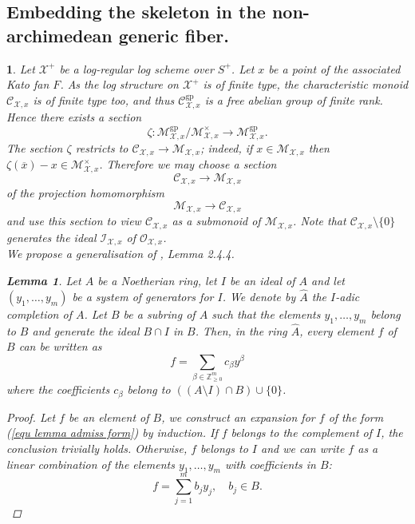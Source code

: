 \documentclass{amsart}%
\numberwithin{equation}{subsection}
\theoremstyle{plain2}
\newtheorem{lemma}[equation]{Lemma}
\theoremstyle{definition2}
\theoremstyle{stepstyle}
\theoremstyle{point}
\theoremstyle{subpoint}
\newtheorem{subpoint}[equation]{}%
\newcommand{\spa}[1]{\begin{subpoint}#1\end{subpoint}}           %
\newcommand{\Z}{\ensuremath{\mathbb{Z}}}
\newcommand{\cX}{\ensuremath{\mathscr{X}}}
\newcommand{\caM}{\ensuremath{\mathcal{M}}}
\newcommand{\caC}{\ensuremath{\mathcal{C}}}
\newcommand{\caI}{\ensuremath{\mathcal{I}}}
\newcommand{\gp}{\mathrm{gp}}
\begin{document}
\subsection{Embedding the skeleton in the non-archimedean generic fiber.}
\spa{Let $\cX^+$ be a log-regular log scheme over $S^+$. Let $x$ be a point of the associated Kato fan $F$. As the log structure on $\cX^+$ is of finite type, the characteristic monoid $\caC_{\cX,x}$ is of finite type too, and thus $\caC_{\cX,x}^\gp$ is a free abelian group of finite rank. Hence there exists a section $$\zeta: \caM_{\cX,x}^\gp / \caM_{\cX,x}^\times \rightarrow \caM_{\cX,x}^\gp.$$ The section $\zeta$ restricts to $\caC_{\cX,x} \rightarrow \caM_{\cX,x}$; indeed, if $x \in \caM_{\cX,x}$ then $\zeta(\overline{x})-x \in \caM_{\cX,x}^\times$. Therefore we may choose a section \begin{equation}\label{eq:sect}\mathcal{C}_{\cX,x}\to
\mathcal{M}_{\cX,x}\end{equation} of the projection homomorphism
$$\mathcal{M}_{\cX,x}\to \mathcal{C}_{\cX,x}$$ and use this section to view $\mathcal{C}_{\cX,x}$ as a submonoid of $\mathcal{M}_{\cX,x}$. Note that $\mathcal{C}_{\cX,x}\setminus \{0\}$ generates the ideal $\caI_{\cX,x}$ of $\mathcal{O}_{\cX,x}$.
\\

We propose a generalisation of \cite{MustataNicaise}, Lemma 2.4.4. \begin{lemma} \label{lemma admissible expansion} Let $A$ be a Noetherian ring, let $I$ be an ideal of $A$ and let $(y_1,\ldots,y_m)$ be a system of generators for $I$. We denote by $\hat{A}$ the $I$-adic completion of $A$. Let $B$ be a subring of $A$ such that the elements $y_1,\ldots,y_m$ belong to $B$ and generate the ideal $B \cap I$ in $B$. Then, in the ring $\hat{A}$, every element $f$ of $B$ can be written as \begin{equation} \label{equ lemma admiss form}
f=\sum_{\beta \in \Z^m_{\geqslant 0}} c_\beta y^\beta
\end{equation} where the coefficients $c_\beta$ belong to $((A\setminus I) \cap B) \cup \{0\}$.
\end{lemma} 
\begin{proof}
Let $f$ be an element of $B$, we construct an expansion for $f$ of the form (\ref{equ lemma admiss form}) by induction. If $f$ belongs to the complement of $I$, the conclusion trivially holds. Otherwise, $f$ belongs to $I$ and we can write $f$ as a linear combination of the elements $y_1,\ldots,y_m$ with coefficients in $B$: $$f= \sum_{j=1}^{m} b_j y_j, \quad b_j \in B.$$


\end{proof}}
\end{document}
